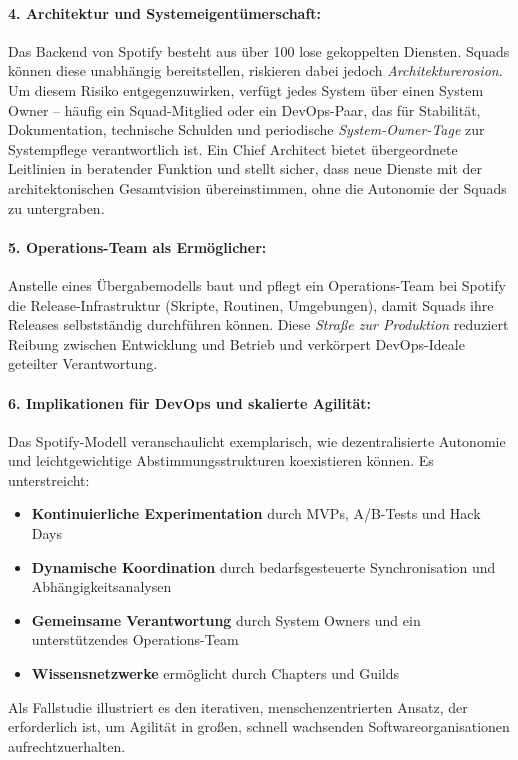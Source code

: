 \paragraph{4. Architektur und Systemeigentümerschaft:}
Das Backend von Spotify besteht aus über 100 lose gekoppelten Diensten. Squads können diese unabhängig bereitstellen, riskieren dabei jedoch \textit{Architekturerosion}. Um diesem Risiko entgegenzuwirken, verfügt jedes System über einen System Owner – häufig ein Squad-Mitglied oder ein DevOps-Paar, das für Stabilität, Dokumentation, technische Schulden und periodische \textit{System-Owner-Tage}  zur Systempflege verantwortlich ist. 
Ein Chief Architect bietet übergeordnete Leitlinien in beratender Funktion und stellt sicher, dass neue Dienste mit der architektonischen Gesamtvision übereinstimmen, ohne die Autonomie der Squads zu untergraben.
\paragraph{5. Operations-Team als Ermöglicher:} Anstelle eines Übergabemodells baut und pflegt ein Operations-Team bei Spotify die Release-Infrastruktur (Skripte, Routinen, Umgebungen), damit Squads ihre Releases selbstständig durchführen können. 
Diese \textit{Straße zur Produktion} reduziert Reibung zwischen Entwicklung und Betrieb und verkörpert DevOps-Ideale geteilter Verantwortung.
\paragraph{6. Implikationen für DevOps und skalierte Agilität:} Das Spotify-Modell veranschaulicht exemplarisch, wie dezentralisierte Autonomie und leichtgewichtige Abstimmungsstrukturen koexistieren können. Es unterstreicht:
\begin{itemize}
    \item \textbf{Kontinuierliche Experimentation} durch MVPs, A/B-Tests und Hack Days
    \item \textbf{Dynamische Koordination} durch bedarfsgesteuerte Synchronisation und Abhängigkeitsanalysen
    \item \textbf{Gemeinsame Verantwortung} durch System Owners und ein unterstützendes Operations-Team
    \item \textbf{Wissensnetzwerke} ermöglicht durch Chapters und Guilds
\end{itemize}
Als Fallstudie illustriert es den iterativen, menschenzentrierten Ansatz, der erforderlich ist, um Agilität in großen, schnell wachsenden Softwareorganisationen aufrechtzuerhalten.

